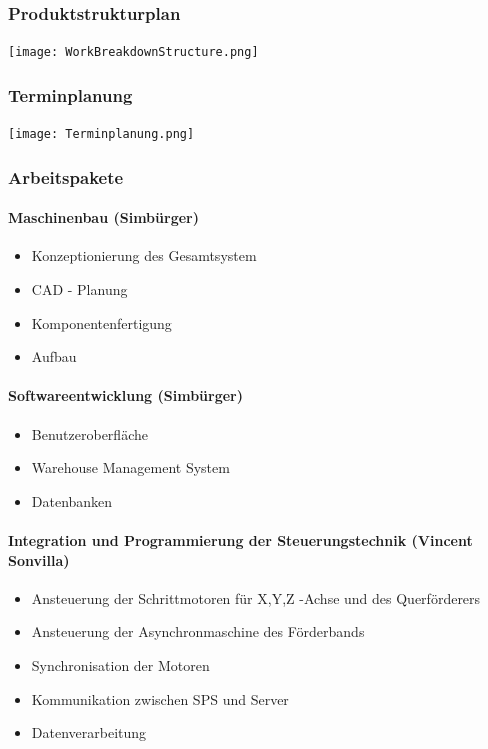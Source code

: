 \subsubsection{Produktstrukturplan}
\vspace{5mm}

\bgroup
    \centering
    \texttt{[image: WorkBreakdownStructure.png]}
\egroup

\newpage
\subsubsection{Terminplanung}
\vspace{5mm}

\bgroup
    \centering
    \texttt{[image: Terminplanung.png]}
\egroup

\newpage

\subsubsection{Arbeitspakete}

\paragraph{Maschinenbau (Simbürger)}
\begin{itemize}
    \item Konzeptionierung des Gesamtsystem
    \item CAD - Planung
    \item Komponentenfertigung
    \item Aufbau 
\end{itemize}

\paragraph{Softwareentwicklung (Simbürger)}
\begin{itemize}
    \item Benutzeroberfläche
    \item Warehouse Management System
    \item Datenbanken
\end{itemize}

\paragraph{Integration und Programmierung der Steuerungstechnik (Vincent Sonvilla)}
\begin{itemize}
    \item Ansteuerung der Schrittmotoren für X,Y,Z -Achse und des Querförderers
    \item Ansteuerung der Asynchronmaschine des Förderbands
    \item Synchronisation der Motoren
    \item Kommunikation zwischen SPS und Server
    \item Datenverarbeitung
\end{itemize}

